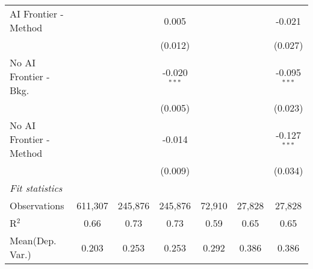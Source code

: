 \begin{tabular}{lcccccc}
   AI Frontier - Method    &               &                & 0.005          &                &                & -0.021\\   
                           &               &                & (0.012)        &                &                & (0.027)\\   
   No AI Frontier - Bkg.   &               &                & -0.020$^{***}$ &                &                & -0.095$^{***}$\\   
                           &               &                & (0.005)        &                &                & (0.023)\\   
   No AI Frontier - Method &               &                & -0.014         &                &                & -0.127$^{***}$\\   
                           &               &                & (0.009)        &                &                & (0.034)\\   
   \midrule
   \emph{Fit statistics}\\
   Observations            & 611,307       & 245,876        & 245,876        & 72,910         & 27,828         & 27,828\\  
   R$^2$                   & 0.66          & 0.73           & 0.73           & 0.59           & 0.65           & 0.65\\  
Mean(Dep. Var.) & 0.203 & 0.253 & 0.253 & 0.292 & 0.386 & 0.386 \\
   

\end{tabular}
